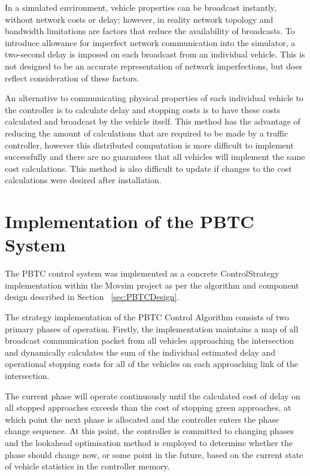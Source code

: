 In a simulated environment, vehicle properties can be broadcast instantly, without network costs or delay; however, in reality network topology and bandwidth limitations are factors that reduce the availability of broadcasts. To introduce allowance for imperfect network communication into the simulator, a two-second delay is imposed on each broadcast from an individual vehicle. This is not designed to be an accurate representation of network imperfections, but does reflect consideration of these factors.
 
An alternative to communicating physical properties of each individual vehicle to the controller is to calculate delay and stopping costs is to have these costs calculated and broadcast by the vehicle itself. This method has the advantage of reducing the amount of calculations that are required to be made by a traffic controller, however this distributed computation is more difficult to implement successfully and there are no guarantees that all vehicles will implement the same cost calculations. This method is also difficult to update if changes to the cost calculations were desired after installation.

\section{Implementation of the PBTC System}

The PBTC control system was implemented as a concrete ControlStrategy implementation within the Movsim project as per the algorithm and component design described in Section ~\ref{sec:PBTCDesign}.

The strategy implementation of the PBTC Control Algorithm consists of two primary phases of operation. Firstly, the implementation maintains a map of all broadcast communication packet from all vehicles approaching the intersection and dynamically calculates the sum of the individual estimated delay and operational stopping costs for all of the vehicles on each approaching link of the intersection.

The current phase will operate continuously until the calculated cost of delay on all stopped approaches exceeds than the cost of stopping green approaches, at which point the next phase is allocated and the controller enters the phase change sequence. At this point, the controller is committed to changing phases and the lookahead optimisation method is employed to determine whether the phase should change now, or some point in the future, based on the current state of vehicle statistics in the controller memory. 

